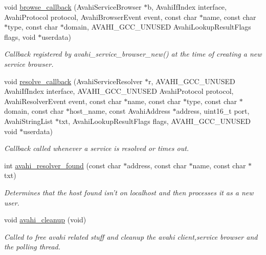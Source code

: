 \begin{DoxyCompactItemize}
void \hyperlink{avahi-discovery_8c_a2b331683eee5e4914140744a173bc068}{browse\-\_\-callback} (\-Avahi\-Service\-Browser $\ast$b, \-Avahi\-If\-Index interface, \-Avahi\-Protocol protocol, \-Avahi\-Browser\-Event event, const char $\ast$name, const char $\ast$type, const char $\ast$domain, \-A\-V\-A\-H\-I\-\_\-\-G\-C\-C\-\_\-\-U\-N\-U\-S\-E\-D \-Avahi\-Lookup\-Result\-Flags flags, void $\ast$userdata)
\begin{DoxyCompactList}\small\item\em \-Callback registered by avahi\-\_\-service\-\_\-browser\-\_\-new() at the time of creating a new service browser. \end{DoxyCompactList}\item 
void \hyperlink{avahi-discovery_8c_a9b958ff0ce85cd9792368b10d92f8076}{resolve\-\_\-callback} (\-Avahi\-Service\-Resolver $\ast$r, \-A\-V\-A\-H\-I\-\_\-\-G\-C\-C\-\_\-\-U\-N\-U\-S\-E\-D \-Avahi\-If\-Index interface, \-A\-V\-A\-H\-I\-\_\-\-G\-C\-C\-\_\-\-U\-N\-U\-S\-E\-D \-Avahi\-Protocol protocol, \-Avahi\-Resolver\-Event event, const char $\ast$name, const char $\ast$type, const char $\ast$domain, const char $\ast$host\-\_\-name, const \-Avahi\-Address $\ast$address, uint16\-\_\-t port, \-Avahi\-String\-List $\ast$txt, \-Avahi\-Lookup\-Result\-Flags flags, \-A\-V\-A\-H\-I\-\_\-\-G\-C\-C\-\_\-\-U\-N\-U\-S\-E\-D void $\ast$userdata)
\begin{DoxyCompactList}\small\item\em \-Callback called whenever a service is resolved or times out. \end{DoxyCompactList}\item 
int \hyperlink{avahi-discovery_8c_aa3f6429c6ea796f2e6917ae703c82a75}{avahi\-\_\-resolver\-\_\-found} (const char $\ast$address, const char $\ast$name, const char $\ast$txt)
\begin{DoxyCompactList}\small\item\em \-Determines that the host found isn't on localhost and then processes it as a new user. \end{DoxyCompactList}\item 
void \hyperlink{avahi-discovery_8c_a2b2ee856af615d834ad55488d0cdf413}{avahi\-\_\-cleanup} (void)
\begin{DoxyCompactList}\small\item\em \-Called to free avahi related stuff and cleanup the avahi client,service browser and the polling thread. \end{DoxyCompactList}\end{DoxyCompactItemize}


